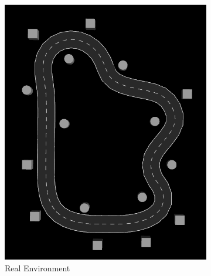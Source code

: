 \begin{figure} 
	\centering
	\begin{subfigure}{.3\linewidth}
		\includegraphics[width=\textwidth]{Pictures/2slamtest}
		\caption{Real Environment}
		\end{subfigure}	
	\begin{subfigure}{.3\linewidth}

\end{subfigure}
\end{figure}
